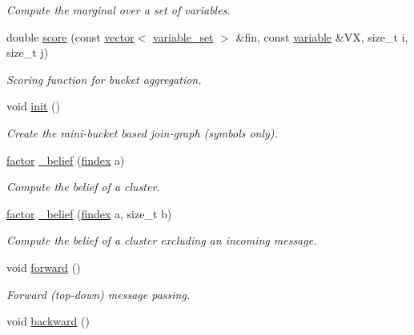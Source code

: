 \begin{DoxyCompactItemize}
\begin{DoxyCompactList}\small\item\em Compute the marginal over a set of variables. \end{DoxyCompactList}\item 
double \hyperlink{classmerlin_1_1ijgp_a3805cbe0335c203902d3741293c30030}{score} (const \hyperlink{classmerlin_1_1vector}{vector}$<$ \hyperlink{classmerlin_1_1variable__set}{variable\+\_\+set} $>$ \&fin, const \hyperlink{classmerlin_1_1variable}{variable} \&V\+X, size\+\_\+t i, size\+\_\+t j)
\begin{DoxyCompactList}\small\item\em Scoring function for bucket aggregation. \end{DoxyCompactList}\item 
void \hyperlink{classmerlin_1_1ijgp_a8300ed201011020d5dffe498d3de44c1}{init} ()
\begin{DoxyCompactList}\small\item\em Create the mini-\/bucket based join-\/graph (symbols only). \end{DoxyCompactList}\item 
\hyperlink{classmerlin_1_1factor}{factor} \hyperlink{classmerlin_1_1ijgp_a4f3dcf08d7786c1f27bfbcaeacf4be32}{\+\_\+belief} (\hyperlink{classmerlin_1_1ijgp_af19ce723db28f47c2b35903adbf3d4bc}{findex} a)
\begin{DoxyCompactList}\small\item\em Compute the belief of a cluster. \end{DoxyCompactList}\item 
\hyperlink{classmerlin_1_1factor}{factor} \hyperlink{classmerlin_1_1ijgp_a047f10dd952cd11612bf8eff6427ecbf}{\+\_\+belief} (\hyperlink{classmerlin_1_1ijgp_af19ce723db28f47c2b35903adbf3d4bc}{findex} a, size\+\_\+t b)
\begin{DoxyCompactList}\small\item\em Compute the belief of a cluster excluding an incoming message. \end{DoxyCompactList}\item 
\hypertarget{classmerlin_1_1ijgp_a61caa150c8d8bdfb7e26640a5d62ebd6}{}void \hyperlink{classmerlin_1_1ijgp_a61caa150c8d8bdfb7e26640a5d62ebd6}{forward} ()\label{classmerlin_1_1ijgp_a61caa150c8d8bdfb7e26640a5d62ebd6}

\begin{DoxyCompactList}\small\item\em Forward (top-\/down) message passing. \end{DoxyCompactList}\item 
\hypertarget{classmerlin_1_1ijgp_a8b80c5fed9c242c85200c84885282287}{}void \hyperlink{classmerlin_1_1ijgp_a8b80c5fed9c242c85200c84885282287}{backward} ()\label{classmerlin_1_1ijgp_a8b80c5fed9c242c85200c84885282287}


\end{DoxyCompactItemize}

